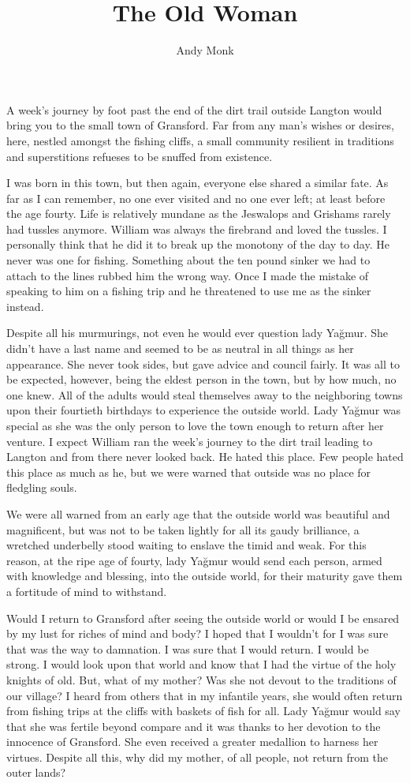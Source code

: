 \documentclass[11pt]{memoir}
\title{The Old Woman}
\author{Andy Monk}
\date{\vspace{-5ex}}
\begin{document}
\maketitle

A week's journey by foot past the end of the dirt trail outside Langton would bring you to the small town of Gransford. Far from any man's wishes or desires, here, nestled amongst the fishing cliffs, a small community resilient in traditions and superstitions refueses to be snuffed from existence.

I was born in this town, but then again, everyone else shared a similar fate. As far as I can remember, no one ever visited and no one ever left; at least before the age fourty. Life is relatively mundane as the Jeswalops and Grishams rarely had tussles anymore. William was always the firebrand and loved the tussles. I personally think that he did it to break up the monotony of the day to day. He never was one for fishing. Something about the ten pound sinker we had to attach to the lines rubbed him the wrong way. Once I made the mistake of speaking to him on a fishing trip and he threatened to use me as the sinker instead.

Despite all his murmurings, not even he would ever question lady Yağmur. She didn't have a last name and seemed to be as neutral in all things as her appearance. She never took sides, but gave advice and council fairly. It was all to be expected, however, being the eldest person in the town, but by how much, no one knew. All of the adults would steal themselves away to the neighboring towns upon their fourtieth birthdays to experience the outside world. Lady Yağmur was special as she was the only person to love the town enough to return after her venture. I expect William ran the week's journey to the dirt trail leading to Langton and from there never looked back. He hated this place. Few people hated this place as much as he, but we were warned that outside was no place for fledgling souls.

We were all warned from an early age that the outside world was beautiful and magnificent, but was not to be taken lightly for all its gaudy brilliance, a wretched underbelly stood waiting to enslave the timid and weak. For this reason, at the ripe age of fourty, lady Yağmur would send each person, armed with knowledge and blessing, into the outside world, for their maturity gave them a fortitude of mind to withstand.

Would I return to Gransford after seeing the outside world or would I be ensared by my lust for riches of mind and body? I hoped that I wouldn't for I was sure that was the way to damnation. I was sure that I would return. I would be strong. I would look upon that world and know that I had the virtue of the holy knights of old. But, what of my mother? Was she not devout to the traditions of our village? I heard from others that in my infantile years, she would often return from fishing trips at the cliffs with baskets of fish for all. Lady Yağmur would say that she was fertile beyond compare and it was thanks to her devotion to the innocence of Gransford. She even received a greater medallion to harness her virtues. Despite all this, why did my mother, of all people, not return from the outer lands?
\end{document}
